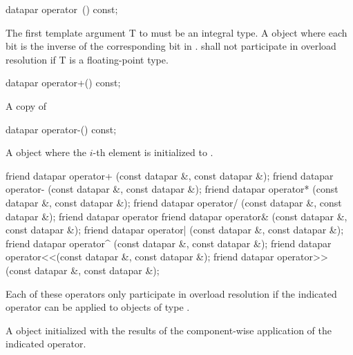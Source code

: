 \begin{itemdecl}
datapar operator~() const;
\end{itemdecl}
\begin{itemdescr}
  \pnum\requires The first template argument \type T to \datapar must be an integral type.
  \pnum\returns A \datapar object where each bit is the inverse of the corresponding bit in .
  \pnum\remarks \datapar{} shall not participate in overload resolution if \type T is a floating-point type.
\end{itemdescr}

\begin{itemdecl}
datapar operator+() const;
\end{itemdecl}
\begin{itemdescr}
  \pnum \returns A copy of 
\end{itemdescr}

\begin{itemdecl}
datapar operator-() const;
\end{itemdecl}
\begin{itemdescr}
  \pnum\returns A \datapar object where the $i$-th element is initialized to  \foralli.
\end{itemdescr}


\begin{itemdecl}
friend datapar operator+ (const datapar &, const datapar &);
friend datapar operator- (const datapar &, const datapar &);
friend datapar operator* (const datapar &, const datapar &);
friend datapar operator/ (const datapar &, const datapar &);
friend datapar operator%
friend datapar operator& (const datapar &, const datapar &);
friend datapar operator| (const datapar &, const datapar &);
friend datapar operator^ (const datapar &, const datapar &);
friend datapar operator<<(const datapar &, const datapar &);
friend datapar operator>>(const datapar &, const datapar &);
\end{itemdecl}
\begin{itemdescr}
  \pnum\remarks Each of these operators only participate in overload resolution if the indicated operator can be applied to objects of type .

  \pnum\returns A \datapar object initialized with the results of the component-wise application of the indicated operator.
\end{itemdescr}

